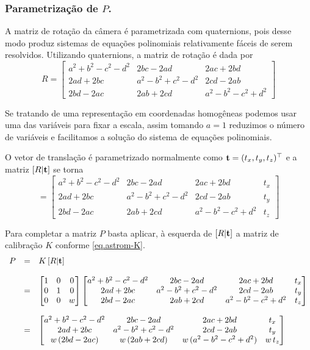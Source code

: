\subsubsection{Parametrização de $P$.}

A matriz de rotação da câmera é parametrizada com quaternions, pois desse modo produz sistemas de equações polinomiais relativamente fáceis de serem resolvidos. Utilizando quaternions, a matriz de rotação é dada por
\begin{equation*}
R=
\begin{bmatrix}
a^2+b^2-c^2-d^2&2bc-2ad&2ac+2bd\\
2ad+2bc&a^2-b^2+c^2-d^2&2cd-2ab\\
2bd-2ac&2ab+2cd&a^2-b^2-c^2+d^2
\end{bmatrix}
\end{equation*}

Se tratando de uma representação em coordenadas homogêneas podemos usar uma das variáveis para fixar a escala, assim tomando $a=1$ reduzimos o número de variáveis e facilitamos a solução do sistema de equações polinomiais.

O vetor de translação é parametrizado normalmente como ${\bf t}=(t_x,t_y,t_z)^\top$ e a matriz $[R|{\bf t}]$ se torna
\begin{equation*}
[R|{\bf t}]=
\begin{bmatrix}
a^2+b^2-c^2-d^2&2bc-2ad&2ac+2bd&t_x\\
2ad+2bc&a^2-b^2+c^2-d^2&2cd-2ab&t_y\\
2bd-2ac&2ab+2cd&a^2-b^2-c^2+d^2&t_z
\end{bmatrix}
\end{equation*}

Para completar a matriz $P$ basta aplicar, à esquerda de $[R|{\bf t}]$ a matriz de calibração $K$ conforme \ref{eq.astrom-K}.
\begin{equation*}
\begin{array}{rcl}
P&=&K\,[R|{\bf t}]\\\\
&=&
\begin{bmatrix}
1&0&0\\
0&1&0\\
0&0&w
\end{bmatrix}
\begin{bmatrix}
a^2+b^2-c^2-d^2&2bc-2ad&2ac+2bd&t_x\\
2ad+2bc&a^2-b^2+c^2-d^2&2cd-2ab&t_y\\
2bd-2ac&2ab+2cd&a^2-b^2-c^2+d^2&t_z
\end{bmatrix}\\\\
&=&
\begin{bmatrix}
a^2+b^2-c^2-d^2&2bc-2ad&2ac+2bd&t_x\\
2ad+2bc&a^2-b^2+c^2-d^2&2cd-2ab&t_y\\
w\,(2bd-2ac)&w\,(2ab+2cd)&w\,(a^2-b^2-c^2+d^2)&w\,t_z
\end{bmatrix}
\end{array}
\end{equation*} 

